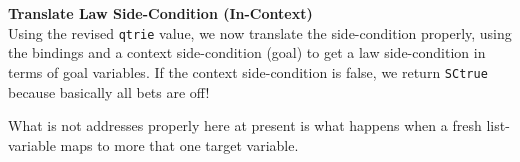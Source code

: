 \textbf{Translate Law Side-Condition (In-Context)}\\ %
Using the revised \texttt{qtrie} value,
we now translate the side-condition properly,
using the bindings and a context side-condition (goal)
to get a law side-condition in terms of goal variables.
If the context side-condition is false,
we return \texttt{SCtrue} because basically all bets are off!

What is not addresses properly here at present is what happens
when a fresh list-variable maps to more that one target variable.
